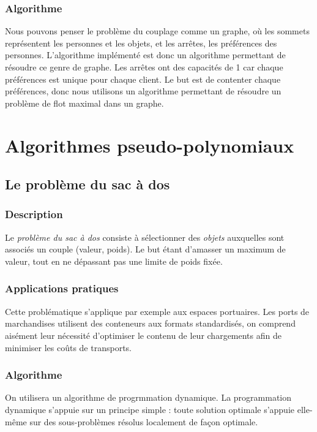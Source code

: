         \subsubsection{Algorithme}
		Nous pouvons penser le problème du couplage comme un graphe,
		 où les sommets représentent les personnes et les objets,
		 et les arrêtes, les préférences des personnes.
		L'algorithme implémenté est donc un algorithme permettant
		 de résoudre ce genre de graphe.
		Les arrêtes ont des capacités de 1 car chaque préférences est unique 
		 pour chaque client.
		Le but est de contenter chaque préférences, donc nous utilisons un
		 algorithme permettant de résoudre un problème de flot maximal
		 dans un graphe.



\section{Algorithmes pseudo-polynomiaux}
    \subsection{Le problème du sac à dos}
        \subsubsection{Description}
            Le \emph{problème du sac à dos} consiste à sélectionner
            des \emph{objets} auxquelles sont associés un couple (valeur, poids).
            Le but étant d'amasser un maximum de valeur, tout en ne dépassant
            pas une limite de poids fixée.
        \subsubsection{Applications pratiques}
            Cette problématique s'applique par exemple aux espaces portuaires.
            Les ports de marchandises utilisent des conteneurs aux formats standardisés,
            on comprend aisément leur nécessité d'optimiser le contenu de leur
            chargements afin de minimiser les coûts de transports.
        \subsubsection{Algorithme}
            On utilisera un algorithme de progrmmation dynamique. La programmation dynamique s'appuie sur un principe simple : 
	    toute solution optimale s'appuie elle-même sur des sous-problèmes résolus localement de façon optimale.  



